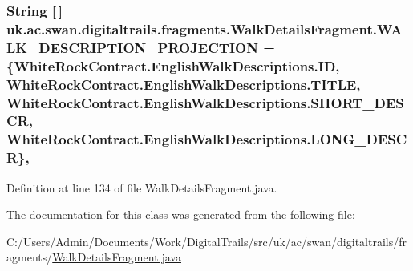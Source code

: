 \hypertarget{classuk_1_1ac_1_1swan_1_1digitaltrails_1_1fragments_1_1_walk_details_fragment_a95052e4513eede3fa8e41f768827d911}{
\subsubsection[{W\+A\+L\+K\+\_\+\+D\+E\+S\+C\+R\+I\+P\+T\+I\+O\+N\+\_\+\+P\+R\+O\+J\+E\+C\+T\+I\+O\+N}]{\setlength{\rightskip}{0pt plus 5cm}String \mbox{[}$\,$\mbox{]} uk.\+ac.\+swan.\+digitaltrails.\+fragments.\+Walk\+Details\+Fragment.\+W\+A\+L\+K\+\_\+\+D\+E\+S\+C\+R\+I\+P\+T\+I\+O\+N\+\_\+\+P\+R\+O\+J\+E\+C\+T\+I\+O\+N = \{White\+Rock\+Contract.\+English\+Walk\+Descriptions.\+I\+D, White\+Rock\+Contract.\+English\+Walk\+Descriptions.\+T\+I\+T\+L\+E, White\+Rock\+Contract.\+English\+Walk\+Descriptions.\+S\+H\+O\+R\+T\+\_\+\+D\+E\+S\+C\+R, White\+Rock\+Contract.\+English\+Walk\+Descriptions.\+L\+O\+N\+G\+\_\+\+D\+E\+S\+C\+R\}\hspace{0.3cm}{\ttfamily [static]}, {\ttfamily [private]}}}\label{classuk_1_1ac_1_1swan_1_1digitaltrails_1_1fragments_1_1_walk_details_fragment_a95052e4513eede3fa8e41f768827d911}


Definition at line 134 of file Walk\+Details\+Fragment.\+java.



The documentation for this class was generated from the following file\+:\begin{DoxyCompactItemize}
\item 
C\+:/\+Users/\+Admin/\+Documents/\+Work/\+Digital\+Trails/src/uk/ac/swan/digitaltrails/fragments/\hyperlink{_walk_details_fragment_8java}{Walk\+Details\+Fragment.\+java}\end{DoxyCompactItemize}
